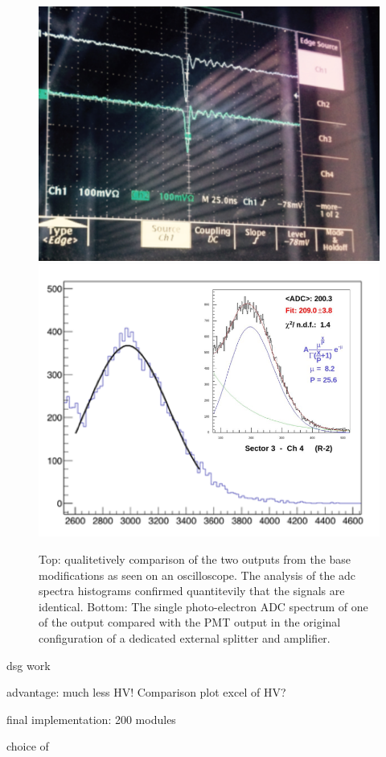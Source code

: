 \begin{figure}
	\centering
	\includegraphics[width=0.87\columnwidth,keepaspectratio]{img/doubleSignal.png}
	\includegraphics[width=0.97\columnwidth,keepaspectratio]{img/fadcOutput.png}
	\caption{Top: qualitetively comparison of the two outputs from the base modifications as seen on an oscilloscope.
				The analysis of the adc spectra histograms confirmed quantitevily that the signals are identical. Bottom:
				The single photo-electron ADC spectrum of one of the output compared with the PMT output in the original
            configuration of a dedicated external splitter and amplifier.
    }
	\label{fig:dividerTests}
\end{figure}




dsg work

advantage: much less HV! Comparison plot excel of HV?



final implementation: 200 modules

choice of
